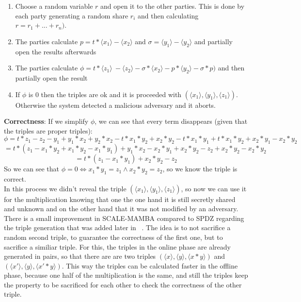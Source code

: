 \documentclass[english,runningheads,a4paper]{llncs}[2018/03/10]
\begin{document}
\begin{enumerate}
\item Choose a random variable \( r\) and open it to the other parties. This is done by each party generating a random share \(r_i\) and then calculating \(r=r_1+...+r_n)\).
\item The parties calculate  \( p=t*\langle x_1 \rangle - \langle x_2 \rangle \) and \( \sigma=\langle y_1 \rangle -  \langle y_2 \rangle \) and partially open the results afterwards
\item The parties calculate \(\phi = t * \langle z_1 \rangle\ - \langle z_2 \rangle - \sigma * \langle x_2 \rangle - p * \langle y_2 \rangle - \sigma * p)\) and then partially open the result
\item If \( \phi \) is 0 then the triples are ok and it is proceeded with \( (\langle x_1 \rangle ,\langle y_1\rangle , \langle z_1\rangle )\). Otherwise the system detected a malicious adversary and it aborts.\\
\end{enumerate}




\textbf{Correctness}: If we simplify \( \phi \), we can see that every term disappears (given that the triples are proper triples):
$$\phi = t*z_1 - z_2 - y_1 + y_1*x_2 + y_2 * x_2 - t * x_1 * y_2 + x_2*y_2 - t*x_1*y_1 + t*x_1*y_2 + x_2*y_1 - x_2*y_2$$
$$ = t*(z_1 - x_1*y_2+x_1*y_2 -x_1*y_1) + y_1*x_2 - x_2*y_1+ x_2*y_2 - z_2 + x_2*y_2 -  x_2*y_2$$
$$= t* (z_1 - x_1*y_1) + x_2*y_2 - z_2 $$
So we can see that \( \phi = 0 \Leftrightarrow x_1 * y_1 = z_1 \land x_2*y_2=z_2 \), so we know the triple is correct. \\
In this process we didn't reveal the triple \( (\langle x_1 \rangle ,\langle y_1\rangle , \langle z_1\rangle ) \), so now we can use it for the multiplication knowing that one the one hand it is still secretly shared and unknown and on the other hand that it was not modified by an adversary.\\


There is a small improvement in SCALE-MAMBA compared to SPDZ regarding the triple generation that was added later in ~\cite{cryptoeprint:2017:123}. The idea is to not sacrifice a random second triple, to guarantee the correctness of the first one, but to sacrifice a similiar triple. For this, the triples in the online phase are already generated in pairs, so that there are are two triples \( (\langle x \rangle ,\langle y \rangle , \langle x*y \rangle ) \) and \( (\langle x' \rangle ,\langle y\rangle , \langle x'*y\rangle ) \). This way the triples can be calculated faster in the offline phase, because one half of the multiplication is the same, and still the triples keep the property to be sacrificed for each other to check the correctness of the other triple.\\\\
\end{document}
